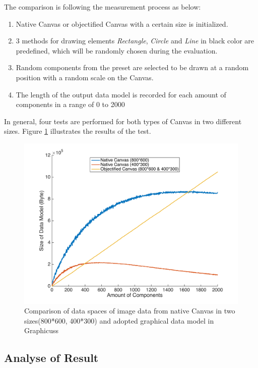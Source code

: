 The comparison is following the measurement process as below:

\begin{enumerate}
  \item Native Canvas or objectified Canvas with a certain size is initialized.
  \item 3 methods for drawing elements \textit{Rectangle}, \textit{Circle} and \textit{Line} in black color are predefined, which will be randomly chosen during the evaluation.
  \item Random components from the preset are selected to be drawn at a random position with a random scale on the Canvas.
  \item The length of the output data model is recorded for each amount of components in a range of 0 to 2000
\end{enumerate}

In general, four tests are performed for both types of Canvas in two different sizes. Figure \ref{fig:eval-size} illustrates the results of the test.


\begin{figure}[!htbp]
  \centering
    \includegraphics[width=1\textwidth]{Figures/eval-size.png}
  \caption{Comparison of data spaces of image data from native Canvas in two sizes(800*600, 400*300) and adopted graphical data model in Graphicuss}
  \label{fig:eval-size}
\end{figure}

\subsection{Analyse of Result }

